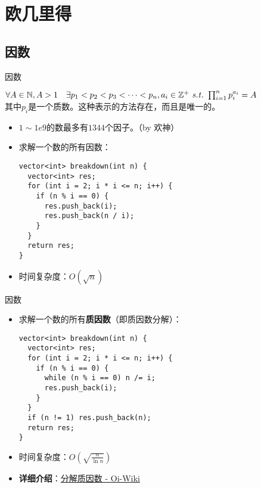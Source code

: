 \section{欧几里得}
\subsection{因数}
\begin{frame}[fragile]{因数}
  \begin{theorem}[算术基本定理]
    $\forall A\in \mathbb{N},A>1 \quad \exists p_1<p_2<p_3<\cdots<p_n,a_i\in \mathbb{Z}^+ \  \mathit{s.t.}\  \prod_{i=1}^n p_i^{a_i}=A$\\
    其中$p_i$是一个质数。这种表示的方法存在，而且是唯一的。
  \end{theorem}
  \pause 
  \begin{itemize}
    \item $1\sim 1e9$的数最多有$1344$个因子。（by 欢神）
    \pause
    \item 求解一个数的所有因数：
    \begin{lstlisting}
vector<int> breakdown(int n) {
  vector<int> res;
  for (int i = 2; i * i <= n; i++) {
    if (n % i == 0) {
      res.push_back(i);
      res.push_back(n / i);
    }
  }
  return res;
}
    \end{lstlisting}
    \item 时间复杂度：$O(\sqrt{n})$
  \end{itemize}
\end{frame}

\begin{frame}[fragile]{因数}
  \begin{itemize}
    \item 求解一个数的所有\textbf{质因数}（即质因数分解）：
    \pause
    \begin{lstlisting}
vector<int> breakdown(int n) {
  vector<int> res;
  for (int i = 2; i * i <= n; i++) {
    if (n % i == 0) {
      while (n % i == 0) n /= i;
      res.push_back(i);
    }
  }
  if (n != 1) res.push_back(n);
  return res;
}
    \end{lstlisting}
    \item 时间复杂度：$O(\sqrt{\frac{n}{\ln{n}}})$
    \pause
    \item \textbf{详细介绍}：\href{https://oi-wiki.org/math/pollard-rho/}{分解质因数 - Oi-Wiki} 
  \end{itemize}
\end{frame}


